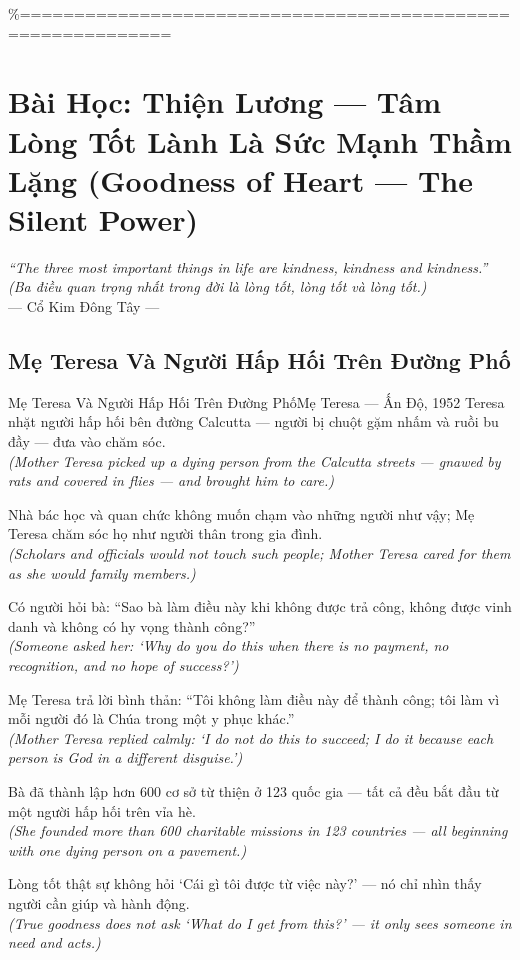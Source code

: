 \%============================================================
\chapter{Bài Học: Thiện Lương --- Tâm Lòng Tốt Lành Là Sức Mạnh Thầm Lặng (Goodness of Heart --- The Silent Power)}
\begin{center}
  \textit{\color{truyengold}``The three most important things in life are kindness, kindness and kindness.''}\\[4pt]
  \textit{(Ba điều quan trọng nhất trong đời là lòng tốt, lòng tốt và lòng tốt.)}\\[4pt]
  \small\color{truyenblue}--- Cổ Kim Đông Tây ---
\end{center}
\ngancach

\section{Mẹ Teresa Và Người Hấp Hối Trên Đường Phố}
\begin{truyen}{Mẹ Teresa Và Người Hấp Hối Trên Đường Phố}{Mẹ Teresa --- Ấn Độ, 1952}
 Teresa nhặt người hấp hối bên đường Calcutta --- người bị chuột gặm nhấm và ruồi bu đầy --- đưa vào chăm sóc.\\[4pt]
\textit{(Mother Teresa picked up a dying person from the Calcutta streets --- gnawed by rats and covered in flies --- and brought him to care.)}

Nhà bác học và quan chức không muốn chạm vào những người như vậy; Mẹ Teresa chăm sóc họ như người thân trong gia đình.\\[4pt]
\textit{(Scholars and officials would not touch such people; Mother Teresa cared for them as she would family members.)}

Có người hỏi bà: ``Sao bà làm điều này khi không được trả công, không được vinh danh và không có hy vọng thành công?''\\[4pt]
\textit{(Someone asked her: `Why do you do this when there is no payment, no recognition, and no hope of success?')}

Mẹ Teresa trả lời bình thản: ``Tôi không làm điều này để thành công; tôi làm vì mỗi người đó là Chúa trong một y phục khác.''\\[4pt]
\textit{(Mother Teresa replied calmly: `I do not do this to succeed; I do it because each person is God in a different disguise.')}

Bà đã thành lập hơn 600 cơ sở từ thiện ở 123 quốc gia --- tất cả đều bắt đầu từ một người hấp hối trên vỉa hè.\\[4pt]
\textit{(She founded more than 600 charitable missions in 123 countries --- all beginning with one dying person on a pavement.)}

\end{truyen}
\begin{baihoc}
  Lòng tốt thật sự không hỏi `Cái gì tôi được từ việc này?' --- nó chỉ nhìn thấy người cần giúp và hành động.\\[4pt]
  \textit{(True goodness does not ask `What do I get from this?' --- it only sees someone in need and acts.)}
\end{baihoc}

